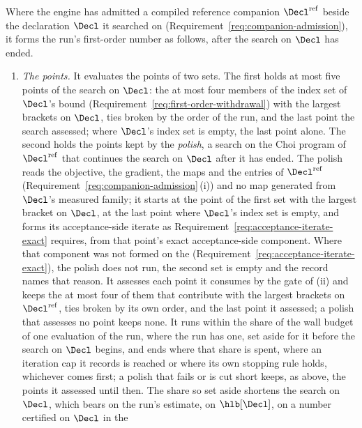 \begin{requirement}\label{req:bracket-on-reference}
Where the engine has admitted a compiled reference companion
$\Decl^{\mathrm{ref}}$ beside the declaration $\Decl$ it searched on
(Requirement~\ref{req:companion-admission}), it forms the run's first-order
number as follows, after the search on $\Decl$ has ended.
\begin{enumerate}[label=(\roman*),leftmargin=2.4em]
\item \emph{The points.} It evaluates the points of two sets. The first
  holds at most five points of the search on $\Decl$: the at most four
  members of the index set of $\Decl$'s bound
  (Requirement~\ref{req:first-order-withdrawal}) with the largest brackets
  on $\Decl$, ties broken by the order of the run, and the last point the
  search assessed; where $\Decl$'s index set is empty, the last point alone.
  The second holds the points kept by the \emph{polish}, a search on the
  Choi program of $\Decl^{\mathrm{ref}}$ that continues the search on
  $\Decl$ after it has ended. The polish reads the objective, the gradient,
  the maps and the entries of $\Decl^{\mathrm{ref}}$
  (Requirement~\ref{req:companion-admission}\,(i)) and no map generated from
  $\Decl$'s measured family; it starts at the point of the first set with
  the largest bracket on $\Decl$, at the last point where $\Decl$'s index
  set is empty, and forms its acceptance-side iterate as
  Requirement~\ref{req:acceptance-iterate-exact} requires, from that point's
  exact acceptance-side component. Where that component was not formed on
  the  (Requirement~\ref{req:acceptance-iterate-exact}),
  the polish does not run, the second set is empty and the record names
  that reason. It assesses each point it consumes by the
  gate of (ii) and keeps the at most four of them that contribute with the
  largest brackets on $\Decl^{\mathrm{ref}}$, ties broken by its own order,
  and the last point it assessed; a polish that assesses no point keeps
  none. It runs within the share  of the
  wall budget of one evaluation of the run, where the run has one, set
  aside for it before the search on $\Decl$ begins, and ends where that
  share is spent, where an iteration cap it records is reached or where its
  own stopping rule holds, whichever comes first; a polish that fails or is
  cut short keeps, as above, the points it assessed until then. The share
  so set aside shortens the search on $\Decl$, which bears on the run's
  estimate, on $\hlb[\Decl]$, on a number certified on $\Decl$ in the

\end{enumerate}
\end{requirement}
